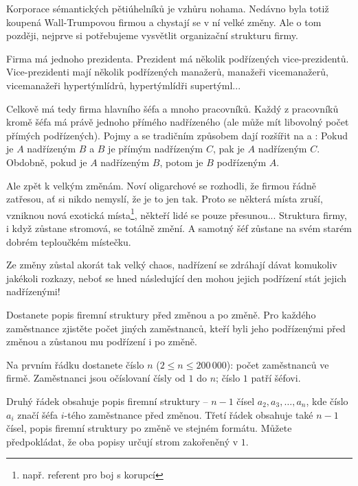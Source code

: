 





Korporace sémantických pětiúhelníků je vzhůru nohama. Nedávno byla totiž koupená
Wall-Trumpovou firmou a chystají se v ní velké změny. Ale o tom později, nejprve
si potřebujeme vysvětlit organizační strukturu firmy.

Firma má jednoho prezidenta. Prezident má několik podřízených vice-prezidentů.
Vice-prezidenti mají několik podřízených manažerů, manažeři vicemanažerů,
vicemanažeři hypertýmlídrů, hypertýmlídři supertýml...

Celkově má tedy firma hlavního šéfa a mnoho pracovníků. Každý z pracovníků kromě
šéfa má právě jednoho přímého nadřízeného (ale může mít libovolný počet přímých
podřízených). Pojmy  a  se tradičním
způsobem dají rozšířit na  a : Pokud je $A$
nadřízeným $B$ a $B$ je přímým nadřízeným $C$, pak je $A$ nadřízeným $C$. Obdobně,
pokud je $A$ nadřízeným $B$, potom je $B$ podřízeným $A$.

Ale zpět k velkým změnám. Noví oligarchové se rozhodli, že firmou řádně zatřesou,
ať si nikdo nemyslí, že je to jen tak. Proto se některá místa zruší, vzniknou
nová exotická místa\footnote{např. referent pro boj s korupcí}, někteří lidé se
pouze přesunou... Struktura firmy, i když zůstane stromová, se totálně změní. A
samotný šéf zůstane na svém starém dobrém teploučkém místečku.

Ze změny zůstal akorát tak velký chaos, nadřízení se zdráhají dávat komukoliv
jakékoli rozkazy, neboť se hned následující den mohou jejich podřízení stát
jejich nadřízenými!


Dostanete popis firemní struktury před změnou a po změně. Pro každého zaměstnance
zjistěte počet jiných zaměstnanců, kteří byli jeho podřízenými před změnou a
zůstanou mu podřízení i po změně.


Na prvním řádku dostanete číslo $n$ ($2 \leq n \leq 200\,000$): počet zaměstnanců ve firmě.
Zaměstnanci jsou očíslovaní čísly od $1$ do $n$; číslo $1$ patří šéfovi.

Druhý řádek obsahuje popis firemní struktury -- $n-1$ čísel $a_2, a_3, \ldots, a_n$, kde
číslo $a_i$ značí šéfa $i$-tého zaměstnance před změnou. Třetí řádek obsahuje také $n-1$
čísel, popis firemní struktury po změně ve stejném formátu. Můžete předpokládat, že oba
popisy určují strom zakořeněný v $1$.

